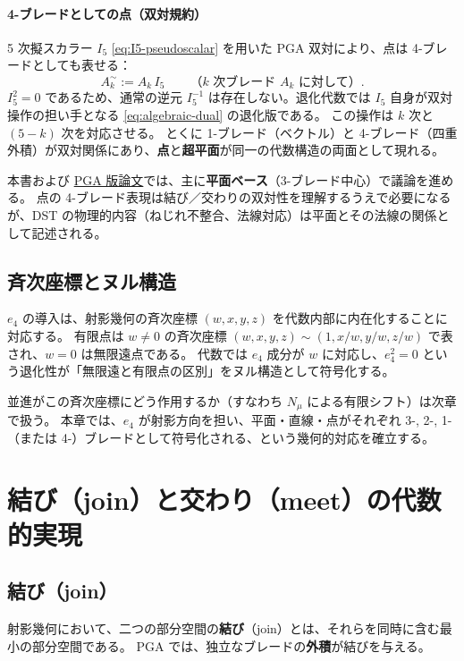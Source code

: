 \documentclass[dvipdfmx,a4paper,oneside]{jsbook}
\numberwithin{equation}{chapter}
\begin{document}
\paragraph{4-ブレードとしての点（双対規約）}
5 次擬スカラー \(I_5\) \eqref{eq:I5-pseudoscalar} を用いた PGA 双対により、点は 4-ブレードとしても表せる：
\begin{equation}
  A_k^{\sim} := A_k\, I_5
  \qquad\text{（\(k\) 次ブレード \(A_k\) に対して）}.
  \label{eq:pga-dual}
\end{equation}
\(I_5^2 = 0\) であるため、通常の逆元 \(I_5^{-1}\) は存在しない。退化代数では \(I_5\) 自身が双対操作の担い手となる \eqref{eq:algebraic-dual} の退化版である。
この操作は \(k\) 次と \((5-k)\) 次を対応させる。
とくに 1-ブレード（ベクトル）と 4-ブレード（四重外積）が双対関係にあり、\textbf{点}と\textbf{超平面}が同一の代数構造の両面として現れる。

本書および \hyperref[sec:sister-manuscripts]{PGA 版論文}では、主に\textbf{平面ベース}（3-ブレード中心）で議論を進める。
点の 4-ブレード表現は結び／交わりの双対性を理解するうえで必要になるが、DST の物理的内容（ねじれ不整合、法線対応）は平面とその法線の関係として記述される。

\subsection{斉次座標とヌル構造}

\(e_4\) の導入は、射影幾何の斉次座標 \((w, x, y, z)\) を代数内部に内在化することに対応する。
有限点は \(w \neq 0\) の斉次座標 \((w, x, y, z) \sim (1, x/w, y/w, z/w)\) で表され、\(w = 0\) は無限遠点である。
代数では \(e_4\) 成分が \(w\) に対応し、\(e_4^2 = 0\) という退化性が「無限遠と有限点の区別」をヌル構造として符号化する。

並進がこの斉次座標にどう作用するか（すなわち \(N_\mu\) による有限シフト）は次章で扱う。
本章では、\(e_4\) が射影方向を担い、平面・直線・点がそれぞれ 3-, 2-, 1-（または 4-）ブレードとして符号化される、という幾何的対応を確立する。

\section{結び（join）と交わり（meet）の代数的実現}

\subsection{結び（join）}

射影幾何において、二つの部分空間の\textbf{結び}（join）とは、それらを同時に含む最小の部分空間である。
PGA では、独立なブレードの\textbf{外積}が結びを与える。
\end{document}

